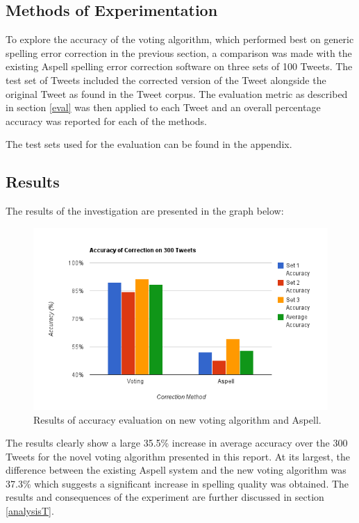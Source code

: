 \subsection{Methods of Experimentation}
To explore the accuracy of the voting algorithm, which performed best on generic spelling error correction in the previous section, a comparison was made with the existing Aspell spelling error correction software on three sets of 100 Tweets. The test set of Tweets included the corrected version of the Tweet alongside the original Tweet as found in the Tweet corpus. The evaluation metric as described in section \ref{eval} was then applied to each Tweet and an overall percentage accuracy was reported for each of the methods.

The test sets used for the evaluation can be found in the appendix.

\subsection{Results}
The results of the investigation are presented in the graph below:

\begin{figure}[H]
	\centering
	\label{fig:accuracychart}
	\includegraphics[scale=0.6]{images/accuracychart}
	\caption{Results of accuracy evaluation on new voting algorithm and Aspell.}
\end{figure}

The results clearly show a large 35.5\% increase in average accuracy over the 300 Tweets for the novel voting algorithm presented in this report. At its largest, the difference between the existing Aspell system and the new voting algorithm was 37.3\% which suggests a significant increase in spelling quality was obtained. The results and consequences of the experiment are further discussed in section \ref{analysisT}.

